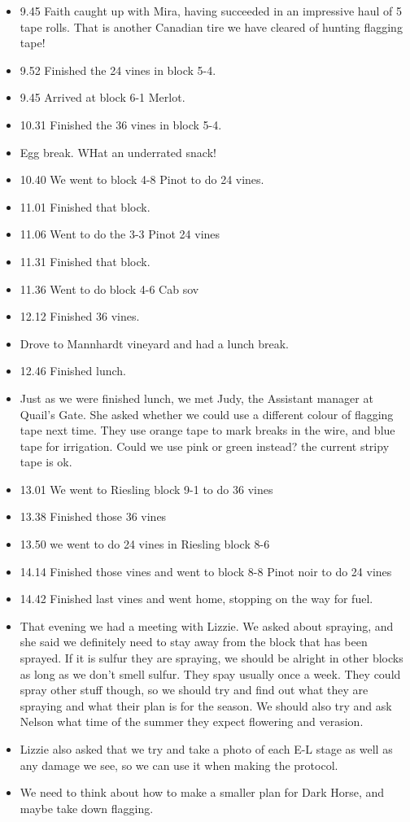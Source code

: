 \documentclass[11pt,letter]{article}
\newenvironment{smitemize}{
\begin{itemize}
  \setlength{\itemsep}{0pt}
  \setlength{\parskip}{0.8pt}
  \setlength{\parsep}{0pt}}
{\end{itemize}
}
\begin{document}
\begin{smitemize}
\item 9.45 Faith caught up with Mira, having succeeded in an impressive haul of 5 tape rolls. That is another Canadian tire we have cleared of hunting flagging tape!
\item 9.52 Finished the 24 vines in block 5-4.
\item 9.45 Arrived at block 6-1 Merlot.
\item 10.31 Finished the 36 vines in block 5-4.
\item Egg break. WHat an underrated snack!
\item 10.40 We went to block 4-8 Pinot to do 24 vines.
\item 11.01 Finished that block.
\item 11.06 Went to do the 3-3 Pinot 24 vines
\item 11.31 Finished that block. 
\item 11.36 Went to do block 4-6 Cab sov
\item 12.12 Finished 36 vines. 
\item Drove to Mannhardt vineyard and had a lunch break.
\item 12.46 Finished lunch.
\item Just as we were finished lunch, we met Judy, the Assistant manager at Quail's Gate. She asked whether we could use a different colour of flagging tape next time. They use orange tape to mark breaks in the wire, and blue tape for irrigation. Could we use pink or green instead? the current stripy tape is ok. 
\item 13.01 We went to Riesling block 9-1 to do 36 vines
\item 13.38 Finished those 36 vines
\item 13.50 we went to do 24 vines in Riesling block 8-6
\item 14.14 Finished those vines and went to block 8-8 Pinot noir to do 24 vines
\item 14.42 Finished last vines and went home, stopping on the way for fuel.

\item That evening we had a meeting with Lizzie. We asked about spraying, and she said we definitely need to stay away from the block that has been sprayed. If it is sulfur they are spraying, we should be alright in other blocks as long as we don't smell sulfur. They spay usually once a week. They could spray other stuff though, so we should try and find out what they are spraying and what their plan is for the season. We should also try and ask Nelson what time of the summer they expect flowering and verasion. 
\item Lizzie also asked that we try and take a photo of each E-L stage as well as any damage we see, so we can use it when making the protocol.
\item We need to think about how to make a smaller plan for Dark Horse, and maybe take down flagging.

\end{smitemize}
\end{document}
